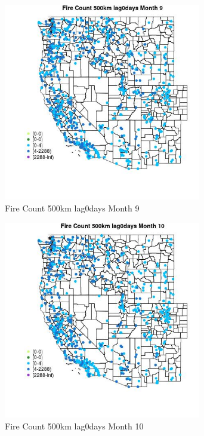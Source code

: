 \begin{figure} 
\centering  
\includegraphics[width=0.77\textwidth]{Code_Outputs/Report_ML_input_PM25_Step4_part_e_de_duplicated_aves_compiled_2019-05-21wNAs_MapObsMo9Fire_Count_500km_lag0days.jpg} 
\caption{\label{fig:Report_ML_input_PM25_Step4_part_e_de_duplicated_aves_compiled_2019-05-21wNAsMapObsMo9Fire_Count_500km_lag0days}Fire Count 500km lag0days Month 9} 
\end{figure} 
 

\begin{figure} 
\centering  
\includegraphics[width=0.77\textwidth]{Code_Outputs/Report_ML_input_PM25_Step4_part_e_de_duplicated_aves_compiled_2019-05-21wNAs_MapObsMo10Fire_Count_500km_lag0days.jpg} 
\caption{\label{fig:Report_ML_input_PM25_Step4_part_e_de_duplicated_aves_compiled_2019-05-21wNAsMapObsMo10Fire_Count_500km_lag0days}Fire Count 500km lag0days Month 10} 
\end{figure} 
 

